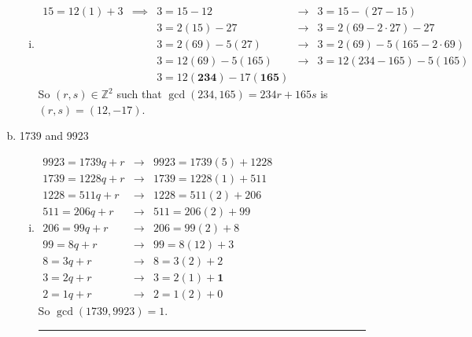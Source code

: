 \documentclass{article}
\begin{document}
\begin{description}
\begin{enumerate}[(a)]
\begin{enumerate}[(i)]
				
				\item$\begin{array}{ccccc}
				15=12(1)+3&  \implies&  3=15-12&  \to&  3=15-(27-15)\\ 
				&  &  3=2(15)-27&  \to&  3=2(69-2\cdot27)-27\\ 
				&  &  3=2(69)-5(27)&  \to&  3=2(69)-5(165-2\cdot69)\\ 
				&  &  3=12(69)-5(165)&  \to&  3=12(234-165)-5(165)\\ 
				&  &  3=12\left(\mathbf{234}\right)-17\left(\mathbf{165}\right)&  & 
				\end{array} $ \\ So $(r,s)\in\mathbb{Z}^2$ such that $\gcd(234,165)=234r+165s$ is $(r,s)=(12,-17)$.  
			\end{enumerate}
		\item 1739 and 9923
		\begin{enumerate}[(i)]
			\item
			$\begin{array}{ccc}
			9923=1739q+r&  \to&  9923=1739(5)+1228\\ 
			1739=1228q+r&  \to&  1739=1228(1)+511\\ 
			1228=511q+r&  \to&  1228=511(2)+206\\ 
			511=206q+r&  \to&  511=206(2)+99\\ 
			206=99q+r&  \to&  206=99(2)+8\\ 
			99=8q+r&  \to&  99=8(12)+3\\ 
			8=3q+r&  \to&  8=3(2)+2\\ 
			3=2q+r&  \to&  3=2(1)+\mathbf{1}\\ 
			2=1q+r&  \to& 2=1(2)+0
			\end{array} $  \\ So $\gcd{(1739,9923)}=1$.\\ \noindent\rule{10cm}{0.4pt}
			

\end{enumerate}
\end{enumerate}
\end{description}
\end{document}
